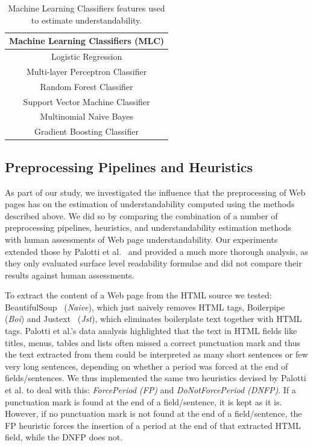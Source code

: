 \documentclass[10pt,a4paper]{article}
\begin{document}
\begin{table}
\caption{Machine Learning Classifiers features used to estimate understandability.}
\label{tab:doc_features_mlc} \vspace{-10pt}
\begin{tabular}{c}
\toprule 
\textbf{Machine Learning Classifiers (MLC)}\tabularnewline
\midrule 
Logistic Regression\tabularnewline
Multi-layer Perceptron Classifier\tabularnewline
Random Forest Classifier\tabularnewline
Support Vector Machine Classifier\tabularnewline
Multinomial Naive Bayes\tabularnewline
Gradient Boosting Classifier\tabularnewline
\bottomrule
\end{tabular}
\end{table}

\subsection*{Preprocessing Pipelines and Heuristics}
\label{sec:pipelines}

As part of our study, we investigated the influence that the preprocessing of Web pages has on the estimation of understandability computed using the methods described above.
We did so by comparing the combination of a number of preprocessing pipelines, heuristics, and understandability estimation methods with human assessments of Web page understandability. 
Our experiments extended those by Palotti et al.~\cite{palotti15} and provided a much more thorough analysis, as they only evaluated surface level readability formulae and did not compare their results against human assessments. 

To extract the content of a Web page from the HTML source we tested: BeautifulSoup~\cite{bs4} (\textit{Naive}), which just naively removes HTML tags, Boilerpipe~\cite{kohlschutter10} (\textit{Boi}) and Justext~\cite{jan11} (\textit{Jst}), which eliminates boilerplate text together with HTML tags. 
Palotti et al.'s data analysis highlighted that the text in HTML fields like titles, menus, tables and lists often missed a correct punctuation mark and thus the text extracted from them could be interpreted as many short sentences or few very long sentences, depending on whether a period was forced at the end of fields/sentences. We thus implemented the same two heuristics devised by Palotti et al. to deal with this: \textit{ForcePeriod (FP)} and \textit{DoNotForcePeriod (DNFP)}. 
If a punctuation mark is found at the end of a field/sentence, it is kept as it is. However, if no punctuation mark is not found at the end of a field/sentence, the FP heuristic forces the insertion of a period at the end of that extracted HTML field, while the DNFP does not.
\end{document}
